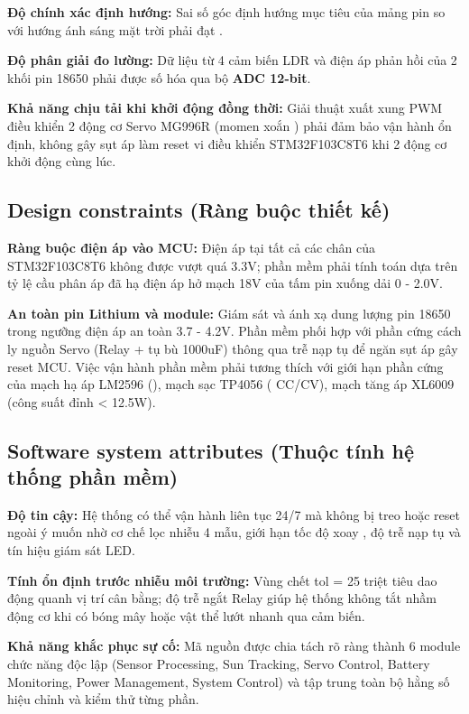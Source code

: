 \documentclass[12pt,a4paper]{report}
\begin{document}
\textbf{Độ chính xác định hướng:} Sai số góc định hướng mục tiêu của mảng pin so với hướng ánh sáng mặt trời phải đạt . 

\textbf{Độ phân giải đo lường:} Dữ liệu từ 4 cảm biến LDR và điện áp phản hồi của 2 khối pin 18650 phải được số hóa qua bộ \textbf{ADC 12-bit}. 

\textbf{Khả năng chịu tải khi khởi động đồng thời:} Giải thuật xuất xung PWM điều khiển 2 động cơ Servo MG996R (momen xoắn ) phải đảm bảo vận hành ổn định, không gây sụt áp làm reset vi điều khiển STM32F103C8T6 khi 2 động cơ khởi động cùng lúc. 

\subsection{Design constraints (Ràng buộc thiết kế)}

\textbf{Ràng buộc điện áp vào MCU:} Điện áp tại tất cả các chân của STM32F103C8T6 không được vượt quá 3.3V; phần mềm phải tính toán dựa trên tỷ lệ cầu phân áp đã hạ điện áp hở mạch 18V của tấm pin xuống dải 0 - 2.0V.

\textbf{An toàn pin Lithium và module:} Giám sát và ánh xạ dung lượng pin 18650 trong ngưỡng điện áp an toàn 3.7 - 4.2V. Phần mềm phối hợp với phần cứng cách ly nguồn Servo (Relay  + tụ bù 1000uF) thông qua trễ nạp tụ để ngăn sụt áp gây reset MCU. Việc vận hành phần mềm phải tương thích với giới hạn phần cứng của mạch hạ áp LM2596 (), mạch sạc TP4056 ( CC/CV), mạch tăng áp XL6009 (công suất đỉnh < 12.5W). 

\subsection{Software system attributes (Thuộc tính hệ thống phần mềm)}

\textbf{Độ tin cậy:} Hệ thống có thể vận hành liên tục 24/7 mà không bị treo hoặc reset ngoài ý muốn nhờ cơ chế lọc nhiễu 4 mẫu, giới hạn tốc độ xoay , độ trễ nạp tụ và tín hiệu giám sát LED.

\textbf{Tính ổn định trước nhiễu môi trường:} Vùng chết tol = 25 triệt tiêu dao động quanh vị trí cân bằng; độ trễ ngắt Relay  giúp hệ thống không tắt nhầm động cơ khi có bóng mây hoặc vật thể lướt nhanh qua cảm biến. 

\textbf{Khả năng khắc phục sự cố:} Mã nguồn được chia tách rõ ràng thành 6 module chức năng độc lập (Sensor Processing, Sun Tracking, Servo Control, Battery Monitoring, Power Management, System Control) và tập trung toàn bộ hằng số hiệu chỉnh và kiểm thử từng phần. 
\end{document}
